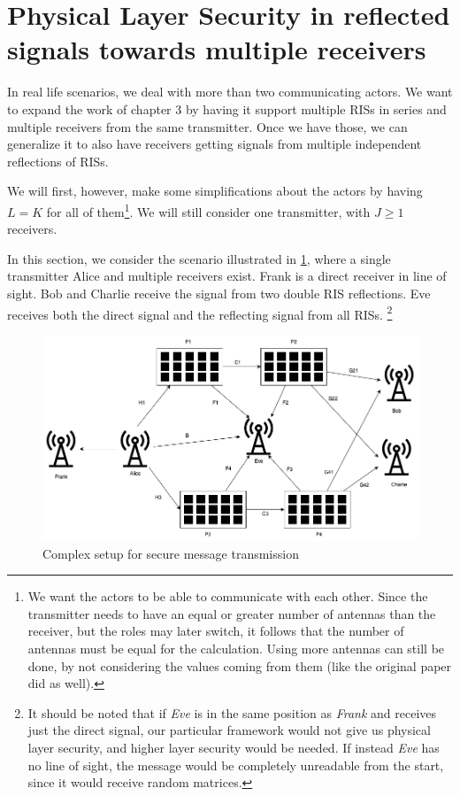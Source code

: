 \section{Physical Layer Security in reflected signals towards multiple receivers}

In real life scenarios, we deal with more than two communicating actors. We want to expand the work of chapter 3 by having it support multiple RISs in series and multiple receivers from the same transmitter. Once we have those, we can generalize it to also have receivers getting signals from multiple independent reflections of RISs.

We will first, however, make some simplifications about the actors by having $L = K$ for all of them\footnote{We want the actors to be able to communicate with each other. Since the transmitter needs to have an equal or greater number of antennas than the receiver, but the roles may later switch, it follows that the number of antennas must be equal for the calculation. Using more antennas can still be done, by not considering the values coming from them (like the original paper did as well).}. We will still consider one transmitter, with $J \ge 1$ receivers.

In this section, we consider the scenario illustrated in \cref{fig:correlation_sk2}, where a single transmitter Alice and multiple receivers exist. Frank is a direct receiver in line of sight. Bob and Charlie receive the signal from two double RIS reflections. Eve receives both the direct signal and the reflecting signal from all RISs. \footnote{It should be noted that if \textit{Eve} is in the same position as \textit{Frank} and receives just the direct signal, our particular framework would not give us physical layer security, and higher layer security would be needed. If instead \textit{Eve} has no line of sight, the message would be completely unreadable from the start, since it would receive random matrices.}

\begin{figure}[H]
  \centering
  \includegraphics[width=\linewidth]{imgs/complex-situation.png}
  \caption{Complex setup for secure message transmission}
  \label{fig:correlation_sk2}
\end{figure}

